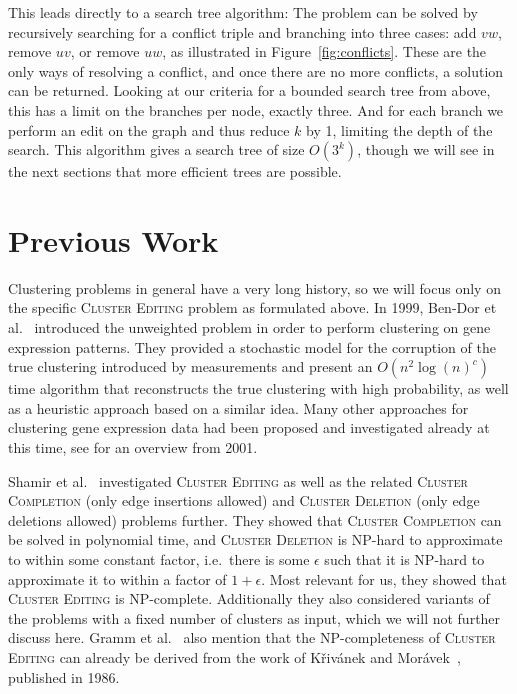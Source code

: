 \documentclass[12pt,oneside,english,parskip=full,headings=small]{scrbook}
\theoremstyle{definition}
\begin{document}
This leads directly to a search tree algorithm: The problem can be solved by recursively searching
for a conflict triple and branching into three cases: add $vw$, remove $uv$, or remove $uw$, as
illustrated in Figure~\ref{fig:conflicts}. These are the only ways of resolving a conflict, and once
there are no more conflicts, a solution can be returned. Looking at our criteria for a bounded
search tree from above, this has a limit on the branches per node, exactly three. And for each
branch we perform an edit on the graph and thus reduce $k$ by 1, limiting the depth of the search.
This algorithm gives a search tree of size $O(3^k)$, though we will see in the next sections that
more efficient trees are possible.

\chapter{Previous Work}

Clustering problems in general have a very long history, so we will focus only on the specific
\textsc{Cluster Editing} problem as formulated above. In 1999, Ben-Dor et al.~\cite{BenDor}
introduced the unweighted problem in order to perform clustering on gene expression patterns. They
provided a stochastic model for the corruption of the true clustering introduced by measurements and
present an $O(n^2 \log(n)^c)$ time algorithm that reconstructs the true clustering with high
probability, as well as a heuristic approach based on a similar idea. Many other approaches for
clustering gene expression data had been proposed and investigated already at this time, see
\cite{ShamirOverview} for an overview from 2001.

Shamir et al.~\cite{ShamirModifications} investigated \textsc{Cluster Editing} as well as
the related \textsc{Cluster Completion} (only edge insertions allowed) and \textsc{Cluster Deletion}
(only edge deletions allowed) problems further. They showed that \textsc{Cluster Completion} can be
solved in polynomial time, and \textsc{Cluster Deletion} is NP-hard to approximate to within some
constant factor, i.e.\ there is some $\epsilon$ such that it is NP-hard to approximate it to within
a factor of $1 + \epsilon$. Most relevant for us, they showed that \textsc{Cluster Editing} is
NP-complete. Additionally they also considered variants of the problems with a fixed number of
clusters as input, which we will not further discuss here. Gramm et al.~\cite{Gramm} also mention
that the NP-completeness of \textsc{Cluster Editing} can already be derived from the work of
Křivánek and Morávek~\cite{Krivanek}, published in 1986.
\end{document}
